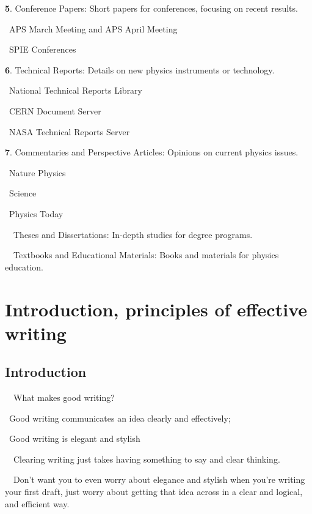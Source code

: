 \documentclass[a4paper, 12pt]{article}
\begin{document}
\textbf{5}. Conference Papers: Short papers for conferences, focusing on recent results.
\par\quad\textopenbullet\ APS March Meeting and APS April Meeting
\par\quad\textopenbullet\ SPIE Conferences

\textbf{6}. Technical Reports: Details on new physics instruments or technology.
\par\quad\textopenbullet\ National Technical Reports Library
\par\quad\textopenbullet\ CERN Document Server
\par\quad\textopenbullet\ NASA Technical Reports Server

\textbf{7}. Commentaries and Perspective Articles: Opinions on current physics issues.
\par\quad\textopenbullet\ Nature Physics
\par\quad\textopenbullet\ Science
\par\quad\textopenbullet\ Physics Today

\newpage\par\ \textbullet\ Theses and Dissertations: In-depth studies for degree programs.
\par\ \textbullet\ Textbooks and Educational Materials: Books and materials for physics education.

\newpage\section{Introduction, principles of effective writing}

\subsection{Introduction}

\par\ \textbullet\ What makes good writing?
\par\quad\textopenbullet\ Good writing communicates an idea clearly and effectively;
\par\quad\textopenbullet\ Good writing is elegant and stylish

\par\ \textbullet\ Clearing writing just takes having something to say and clear thinking.

\par\ \textbullet\ Don't want you to even worry about elegance and stylish when you're writing your first draft, just worry about getting that idea across in a clear and logical, and efficient way.
\end{document}
